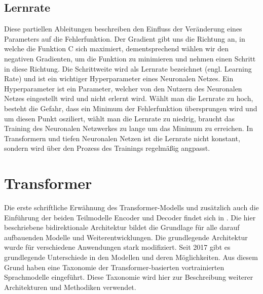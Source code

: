 \subsection{Lernrate}
Diese partiellen Ableitungen beschreiben den Einfluss der Veränderung eines Parameters auf die Fehlerfunktion. Der Gradient gibt uns die Richtung an, in welche die Funktion C sich maximiert, dementsprechend wählen wir den negativen Gradienten, um die Funktion zu minimieren und nehmen einen Schritt in diese Richtung. Die Schrittweite wird als Lernrate bezeichnet (engl. Learning Rate) und ist ein wichtiger Hyperparameter eines Neuronalen Netzes.
Ein Hyperparameter ist ein Parameter, welcher von den Nutzern des Neuronalen Netzes eingestellt wird und nicht erlernt wird. Wählt man die Lernrate zu hoch, besteht die Gefahr, dass ein Minimum der Fehlerfunktion übersprungen wird und um diesen Punkt osziliert, wählt man die Lernrate zu niedrig, braucht das Training des Neuronalen Netzwerkes zu lange um das Minimum zu erreichen.
In Transformern und tiefen Neuronalen Netzen ist die Lernrate nicht konstant, sondern wird über den Prozess des Trainings regelmäßig angpasst. 

\section{Transformer}\label{sec:transformer}
%
Die erste schriftliche Erwähnung des Transformer-Modells und zusätzlich auch die Einführung der beiden Teilmodelle Encoder und Decoder findet sich in \citet{attention}.
Die hier beschriebene bidirektionale Architektur bildet die Grundlage für alle darauf aufbauenden Modelle und Weiterentwicklungen.
Die grundlegende Architektur wurde für verschiedene Anwendungen stark modifiziert.
Seit 2017 gibt es grundlegende Unterschiede in den Modellen und deren Möglichkeiten.
Aus diesem Grund haben \citet{ammus} eine Taxonomie der Transformer-basierten vortrainierten Sprachmodelle eingeführt.
Diese Taxonomie wird hier zur Beschreibung weiterer Architekturen und Methodiken verwendet.\\

